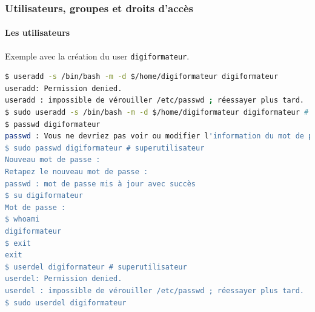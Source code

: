\documentclass{beamer}
\begin{document}
    \begin{frame}[fragile]
        \transdissolve
        \frametitle{Utilisateurs, groupes et droits d'accès}
        \framesubtitle{Les utilisateurs}
        Exemple avec la création du user \lstinline{digiformateur}.
        \begin{lstlisting}[language=bash]
$ useradd -s /bin/bash -m -d $/home/digiformateur digiformateur
useradd: Permission denied.
useradd : impossible de vérouiller /etc/passwd ; réessayer plus tard.
$ sudo useradd -s /bin/bash -m -d $/home/digiformateur digiformateur # sudo
$ passwd digiformateur
passwd : Vous ne devriez pas voir ou modifier l'information du mot de passe pour digiformateur.
$ sudo passwd digiformateur # superutilisateur
Nouveau mot de passe : 
Retapez le nouveau mot de passe : 
passwd : mot de passe mis à jour avec succès
$ su digiformateur
Mot de passe : 
$ whoami
digiformateur
$ exit
exit
$ userdel digiformateur # superutilisateur
userdel: Permission denied.
userdel : impossible de vérouiller /etc/passwd ; réessayer plus tard.
$ sudo userdel digiformateur
        \end{lstlisting}
    \end{frame}
\end{document}

